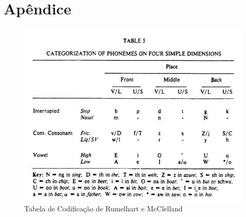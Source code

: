 \chapter{Apêndice}
\label{ch07:appendice}

\begin{figure}[H]
  \centering
  \includegraphics[width=0.5\linewidth]{img/Screen_Shot_2018-10-01_at_21_28_59.png}
  \caption{Tabela de Codificação de Rumelhart e McClelland}
  \label{fig:table-eng}
\end{figure}